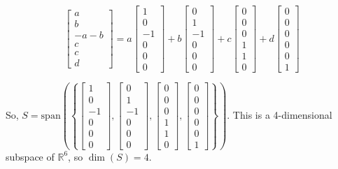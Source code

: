 \documentclass[11pt]{article}
\begin{document}
\begin{prob}
\begin{solution}
$$\begin{bmatrix} a \\ b \\ -a-b \\ c \\ c \\ d \end{bmatrix} = a \begin{bmatrix} 1 \\ 0 \\ -1 \\ 0 \\ 0 \\ 0 \end{bmatrix} + b \begin{bmatrix} 0 \\ 1 \\ -1 \\ 0 \\ 0 \\ 0 \end{bmatrix} + c \begin{bmatrix} 0 \\ 0 \\ 0 \\ 1 \\ 1 \\ 0 \end{bmatrix} + d \begin{bmatrix} 0 \\ 0 \\ 0 \\ 0 \\ 0 \\ 1 \end{bmatrix}$$

So, $S = \text{span}\left(\left\{ \begin{bmatrix} 1 \\ 0 \\ -1 \\ 0 \\ 0 \\ 0 \end{bmatrix}, \begin{bmatrix} 0 \\ 1 \\ -1 \\ 0 \\ 0 \\ 0 \end{bmatrix}, \begin{bmatrix} 0 \\ 0 \\ 0 \\ 1 \\ 1 \\ 0 \end{bmatrix}, \begin{bmatrix} 0 \\ 0 \\ 0 \\ 0 \\ 0 \\ 1 \end{bmatrix} \right\}\right)$. This is a 4-dimensional subspace of $\mathbb{R}^6$, so $\dim(S) = 4$.


\end{solution}
\end{prob}
\end{document}
